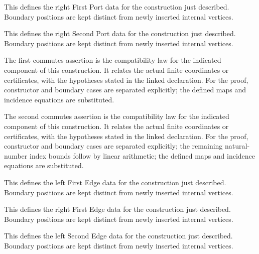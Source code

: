 This defines the right First Port data for the construction just described. Boundary positions are kept distinct from newly inserted internal vertices.
\par{}

This defines the right Second Port data for the construction just described. Boundary positions are kept distinct from newly inserted internal vertices.
\par{}

The first commutes assertion is the compatibility law for the indicated component of this construction. It relates the actual finite coordinates or certificates, with the hypotheses stated in the linked declaration.
For the proof, constructor and boundary cases are separated explicitly; the defined maps and incidence equations are substituted.
\par{}

The second commutes assertion is the compatibility law for the indicated component of this construction. It relates the actual finite coordinates or certificates, with the hypotheses stated in the linked declaration.
For the proof, constructor and boundary cases are separated explicitly; the remaining natural-number index bounds follow by linear arithmetic; the defined maps and incidence equations are substituted.
\par{}

This defines the left First Edge data for the construction just described. Boundary positions are kept distinct from newly inserted internal vertices.
\par{}

This defines the right First Edge data for the construction just described. Boundary positions are kept distinct from newly inserted internal vertices.
\par{}

This defines the left Second Edge data for the construction just described. Boundary positions are kept distinct from newly inserted internal vertices.
\par{}


